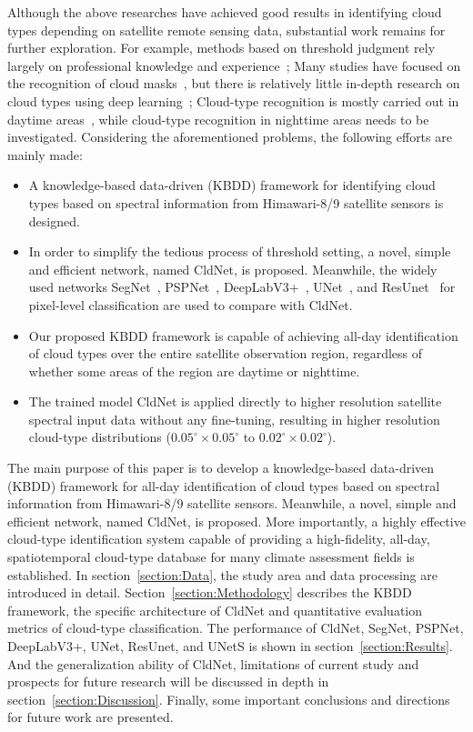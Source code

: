 \documentclass[review]{elsarticle}
\begin{document}
Although the above researches have achieved good results in identifying cloud types depending on satellite remote sensing data, substantial work remains for further exploration.
For example, methods based on threshold judgment rely largely on professional knowledge and experience~\citep{YANG2022112971};
Many studies have focused on the recognition of cloud masks~\citep{TANA2023113548, WANG2022113079, CARABALLOVEGA2023113332}, but there is relatively little in-depth research on cloud types using deep learning~\citep{Larosa15071798, Zhao10058897};
Cloud-type recognition is mostly carried out in daytime areas~\citep{Huang9883178}, while cloud-type recognition in nighttime areas needs to be investigated.
Considering the aforementioned problems, the following efforts are mainly made:
\begin{itemize}%
    \item A knowledge-based data-driven (KBDD) framework for identifying cloud types based on spectral information from Himawari-8/9 satellite sensors is designed.
    \item In order to simplify the tedious process of threshold setting, a novel, simple and efficient network, named CldNet, is proposed. Meanwhile, the widely used networks SegNet~\citep{SegNet}, PSPNet~\citep{PSPNet}, DeepLabV3+~\citep{DeepLabV3plus}, UNet~\citep{UNet}, and ResUnet~\citep{ResUnet} for pixel-level classification are used to compare with CldNet.
    \item Our proposed KBDD framework is capable of achieving all-day identification of cloud types over the entire satellite observation region, regardless of whether some areas of the region are daytime or nighttime.
    \item The trained model CldNet is applied directly to higher resolution satellite spectral input data without any fine-tuning, resulting in higher resolution cloud-type distributions ($\mathrm{0.05^{\circ}\times0.05^{\circ}}$ to $\mathrm{0.02^{\circ}\times0.02^{\circ}}$).
\end{itemize}

The main purpose of this paper is to develop a knowledge-based data-driven (KBDD) framework for all-day identification of cloud types based on spectral information from Himawari-8/9 satellite sensors.
Meanwhile, a novel, simple and efficient network, named CldNet, is proposed.
More importantly, a highly effective cloud-type identification system capable of providing a high-fidelity, all-day, spatiotemporal cloud-type database for many climate assessment fields is established.
In section~\ref{section:Data}, the study area and data processing are introduced in detail. Section~\ref{section:Methodology} describes the KBDD framework, the specific architecture of CldNet and quantitative evaluation metrics of cloud-type classification.
The performance of CldNet, SegNet, PSPNet, DeepLabV3+, UNet, ResUnet, and UNetS is shown in section~\ref{section:Results}.
And the generalization ability of CldNet, limitations of current study and prospects for future research will be discussed in depth in section~\ref{section:Discussion}.
Finally, some important conclusions and directions for future work are presented.
\end{document}
